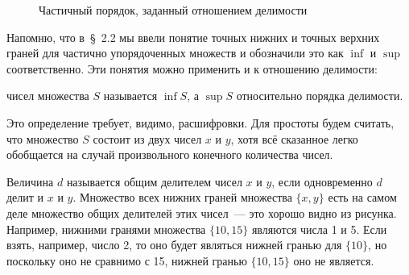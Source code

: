 \begin{figure}[h]
\centering
{}
\caption{Частичный порядок, заданный отношением делимости}
\end{figure}

Напомню, что в~\S~2.2 мы ввели понятие точных нижних и точных верхних граней для частично упорядоченных множеств и обозначили это как $\inf$ и $\sup$ соответственно. Эти понятия можно применить и к отношению делимости:

\begin{definition}
 чисел множества $S$ называется $\inf S$, а  $\sup S$ относительно порядка делимости.
\end{definition}

Это определение требует, видимо, расшифровки. Для простоты будем считать, что множество $S$ состоит из двух чисел $x$ и $y$, хотя всё сказанное легко обобщается на случай произвольного конечного количества чисел.

Величина $d$ называется общим делителем чисел $x$ и $y$, если одновременно $d$ делит и $x$ и $y$. Множество всех нижних граней множества $\{x, y\}$ есть на самом деле множество общих делителей этих чисел~— это хорошо видно из рисунка. Например, нижними гранями множества $\{10, 15\}$ являются числа 1 и 5. Если взять, например, число 2, то оно будет являться нижней гранью для $\{10\}$, но поскольку оно не сравнимо с 15, нижней гранью $\{10, 15\}$ оно не является.

